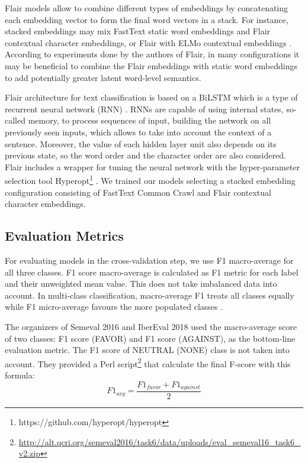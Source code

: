 \documentclass[10pt, a4paper]{article}
\begin{document}
Flair models allow to combine different types of embeddings by concatenating each embedding vector to form the final word vectors in a stack. For instance, stacked embeddings may mix FastText static word embeddings and Flair contextual character embeddings, or Flair with ELMo contextual embeddings \cite{Peters2018}. According to experiments done by the authors of Flair, in many configurations it may be beneficial to combine the Flair embeddings with static word embeddings to add potentially greater latent word-level semantics.

Flair architecture for text classification is based on a BiLSTM which is a type of recurrent neural network (RNN) \cite{Schuster97}. RNNs are capable of using internal states, so-called memory, to process sequences of input, building the network on all previously seen inputs, which allows to take into account the context of a sentence. Moreover, the value of each hidden layer unit also depends on its previous state, so the word order and the character order are also considered. Flair includes a wrapper for tuning the neural network with the hyper-parameter selection tool Hyperopt\footnote{https://github.com/hyperopt/hyperopt} \cite{Bergstra:2013:MSM:3042817.3042832}. We trained our models selecting a stacked embedding configuration consisting of FastText Common Crawl and Flair contextual character embeddings.

\subsection{Evaluation Metrics}

For evaluating models in the cross-validation step, we use F1 macro-average for all three classes. F1 score macro-average is calculated as F1 metric for each label and their unweighted mean value. This does not take imbalanced data into account. In multi-class classification, macro-average F1 treats all classes equally while F1 micro-average favours the more populated classes \cite{Sokolova:2009}.

The organizers of Semeval 2016 and IberEval 2018 used the macro-average score of two classes: F1 score (FAVOR) and F1 score (AGAINST), as the bottom-line evaluation metric. The F1 score of NEUTRAL (NONE) class is not taken into account. They provided a Perl script\footnote{\url{http://alt.qcri.org/semeval2016/task6/data/uploads/eval_semeval16_task6_v2.zip}} that calculate the final F-score with this formula: 
\[F1_{avg} = \frac{F1_{favor} + F1_{against}}{2}\]
\end{document}
